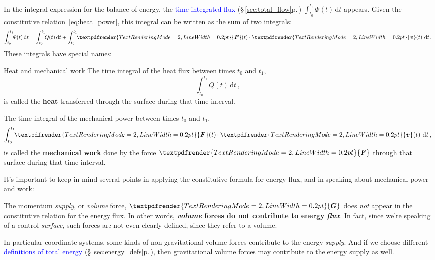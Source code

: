 \documentclass[a4paper,12pt,%
onecolumn,oneside,%
british%
]{memoir}
\renewcommand*{\bm}[1]{\textpdfrender{TextRenderingMode=2,LineWidth=0.2pt}{\boldsymbol{#1}}}
\newcommand*{\di}{\mathrm{d}}%
\renewcommand*{\|}[1][]{\nonscript\:#1\vert\nonscript\:\mathopen{}}
\newcommand*{\sect}{\S}%
\renewcommand*{\autoref}[3][\sect\,\ref]{\textcolor{blue}{#3} {\color{blue}\scriptsize(\faIcon[regular]{eye}\;#1{#2}\;p.\,\pageref{#2})}}
\newcommand*{\yv}{\bm{v}}
\newcommand*{\yti}{t_{0}}
\newcommand*{\ytf}{t_{1}}
\newcommand*{\dt}{\di t}
\newcommand*{\yH}{\varPhi}%
\newcommand*{\yQ}{Q}%
\newcommand*{\yF}{\bm{F}}
\newcommand*{\yG}{\bm{G}}
\begin{document}
\medskip

In the integral expression for the balance of energy, the \autoref{sec:total_flow}{time-integrated flux} $\int_{\yti}^{\ytf}\!\!\yH(t)\,\dt$ appears. Given the constitutive relation~\eqref{eq:heat_power}, this integral can be written as the sum of two integrals:
\begin{equation*}
  \int_{\yti}^{\ytf}\!\!\yH(t)\,\dt =
  \int_{\yti}^{\ytf}\!\!\yQ(t)\,\dt
  + \int_{\yti}^{\ytf}\!\!\yF(t)\cdot \yv(t)\ \dt \,.
\end{equation*}
These integrals have special names:
\begin{definition}{Heat and mechanical work}\label{def:heatwork}
  The time integral of the heat flux between times $\yti$ and $\ytf$,
  \begin{equation*}
  \int_{\yti}^{\ytf}\!\!\yQ(t)\,\dt \,,
  \end{equation*}
  is called the \textbf{heat} transferred through the surface during that time interval.

  \smallskip

  The time integral of the mechanical power between times $\yti$ and $\ytf$,
  \begin{equation*}
  \int_{\yti}^{\ytf}\!\!\yF(t)\cdot \yv(t)\ \dt \,,
  \end{equation*}
  is called the \textbf{mechanical work} done by the force $\yF$ through that surface during that time interval.
\end{definition}

\medskip

It's important to keep in mind several points in applying the constitutive formula for energy flux, and in speaking about mechanical power and work:
%
\begin{warning}[Momentum supply does not contribute to energy flux,label={warn:gravitywork}]
  The momentum \emph{supply}, or \emph{volume} force, $\yG$ does \emph{not} appear in the constitutive relation for the energy flux. In other words, \textbf{\emph{volume} forces do not contribute to energy \emph{flux}}. In fact, since we're speaking of a control \emph{surface}, such forces are not even clearly defined, since they refer to a volume.

\smallskip

In particular coordinate systems, some kinds of non-gravitational volume forces contribute to the energy \emph{supply}. And if we choose different \autoref{sec:energy_defs}{definitions of total energy}, then gravitational volume forces may contribute to the energy supply as well.
\end{warning}
\end{document}
